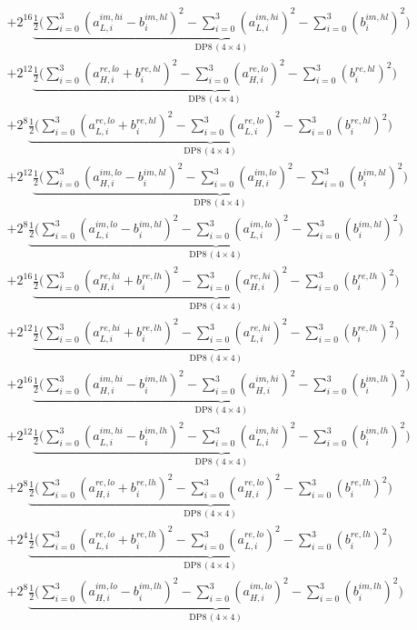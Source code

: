 \documentclass[fleqn]{article}
\newcommand{\DPop}[3]{\mathrm{DP#1}\,(#2\!\times\!#3)}
\begin{document}
\begin{align*}
  & + 2^{16}\underbrace{\tfrac{1}{2}\Big(\sum_{i=0}^{3}(a_{L,i}^{im,hi}{-}b_i^{im,hl})^2 - \sum_{i=0}^{3}(a_{L,i}^{im,hi})^2 - \sum_{i=0}^{3}(b_i^{im,hl})^2\Big)}_{\DPop{8}{4}{4}} \\[0.5em]
  & + 2^{12}\underbrace{\tfrac{1}{2}\Big(\sum_{i=0}^{3}(a_{H,i}^{re,lo}{+}b_i^{re,hl})^2 - \sum_{i=0}^{3}(a_{H,i}^{re,lo})^2 - \sum_{i=0}^{3}(b_i^{re,hl})^2\Big)}_{\DPop{8}{4}{4}} \\[0.5em]
  & + 2^{8}\underbrace{\tfrac{1}{2}\Big(\sum_{i=0}^{3}(a_{L,i}^{re,lo}{+}b_i^{re,hl})^2 - \sum_{i=0}^{3}(a_{L,i}^{re,lo})^2 - \sum_{i=0}^{3}(b_i^{re,hl})^2\Big)}_{\DPop{8}{4}{4}} \\[0.5em]
  & + 2^{12}\underbrace{\tfrac{1}{2}\Big(\sum_{i=0}^{3}(a_{H,i}^{im,lo}{-}b_i^{im,hl})^2 - \sum_{i=0}^{3}(a_{H,i}^{im,lo})^2 - \sum_{i=0}^{3}(b_i^{im,hl})^2\Big)}_{\DPop{8}{4}{4}} \\[0.5em]
  & + 2^{8}\underbrace{\tfrac{1}{2}\Big(\sum_{i=0}^{3}(a_{L,i}^{im,lo}{-}b_i^{im,hl})^2 - \sum_{i=0}^{3}(a_{L,i}^{im,lo})^2 - \sum_{i=0}^{3}(b_i^{im,hl})^2\Big)}_{\DPop{8}{4}{4}} \\[0.5em]
  & + 2^{16}\underbrace{\tfrac{1}{2}\Big(\sum_{i=0}^{3}(a_{H,i}^{re,hi}{+}b_i^{re,lh})^2 - \sum_{i=0}^{3}(a_{H,i}^{re,hi})^2 - \sum_{i=0}^{3}(b_i^{re,lh})^2\Big)}_{\DPop{8}{4}{4}} \\[0.5em]
  & + 2^{12}\underbrace{\tfrac{1}{2}\Big(\sum_{i=0}^{3}(a_{L,i}^{re,hi}{+}b_i^{re,lh})^2 - \sum_{i=0}^{3}(a_{L,i}^{re,hi})^2 - \sum_{i=0}^{3}(b_i^{re,lh})^2\Big)}_{\DPop{8}{4}{4}} \\[0.5em]
  & + 2^{16}\underbrace{\tfrac{1}{2}\Big(\sum_{i=0}^{3}(a_{H,i}^{im,hi}{-}b_i^{im,lh})^2 - \sum_{i=0}^{3}(a_{H,i}^{im,hi})^2 - \sum_{i=0}^{3}(b_i^{im,lh})^2\Big)}_{\DPop{8}{4}{4}} \\[0.5em]
  & + 2^{12}\underbrace{\tfrac{1}{2}\Big(\sum_{i=0}^{3}(a_{L,i}^{im,hi}{-}b_i^{im,lh})^2 - \sum_{i=0}^{3}(a_{L,i}^{im,hi})^2 - \sum_{i=0}^{3}(b_i^{im,lh})^2\Big)}_{\DPop{8}{4}{4}} \\[0.5em]
  & + 2^{8}\underbrace{\tfrac{1}{2}\Big(\sum_{i=0}^{3}(a_{H,i}^{re,lo}{+}b_i^{re,lh})^2 - \sum_{i=0}^{3}(a_{H,i}^{re,lo})^2 - \sum_{i=0}^{3}(b_i^{re,lh})^2\Big)}_{\DPop{8}{4}{4}} \\[0.5em]
  & + 2^{4}\underbrace{\tfrac{1}{2}\Big(\sum_{i=0}^{3}(a_{L,i}^{re,lo}{+}b_i^{re,lh})^2 - \sum_{i=0}^{3}(a_{L,i}^{re,lo})^2 - \sum_{i=0}^{3}(b_i^{re,lh})^2\Big)}_{\DPop{8}{4}{4}} \\[0.5em]
  & + 2^{8}\underbrace{\tfrac{1}{2}\Big(\sum_{i=0}^{3}(a_{H,i}^{im,lo}{-}b_i^{im,lh})^2 - \sum_{i=0}^{3}(a_{H,i}^{im,lo})^2 - \sum_{i=0}^{3}(b_i^{im,lh})^2\Big)}_{\DPop{8}{4}{4}} \\[0.5em]

\end{align*}
\end{document}
